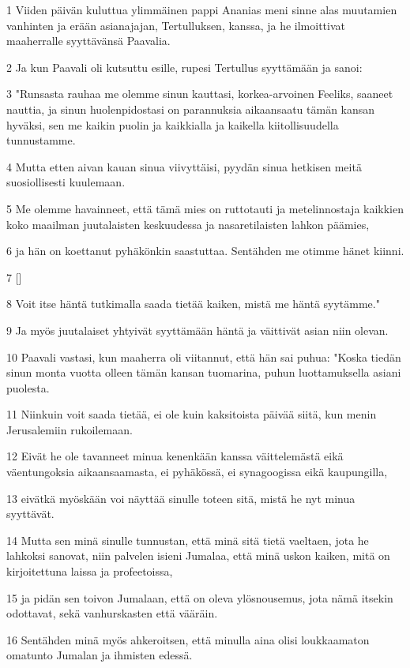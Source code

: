 \par 1 Viiden päivän kuluttua ylimmäinen pappi Ananias meni sinne alas muutamien vanhinten ja erään asianajajan, Tertulluksen, kanssa, ja he ilmoittivat maaherralle syyttävänsä Paavalia.
\par 2 Ja kun Paavali oli kutsuttu esille, rupesi Tertullus syyttämään ja sanoi:
\par 3 "Runsasta rauhaa me olemme sinun kauttasi, korkea-arvoinen Feeliks, saaneet nauttia, ja sinun huolenpidostasi on parannuksia aikaansaatu tämän kansan hyväksi, sen me kaikin puolin ja kaikkialla ja kaikella kiitollisuudella tunnustamme.
\par 4 Mutta etten aivan kauan sinua viivyttäisi, pyydän sinua hetkisen meitä suosiollisesti kuulemaan.
\par 5 Me olemme havainneet, että tämä mies on ruttotauti ja metelinnostaja kaikkien koko maailman juutalaisten keskuudessa ja nasaretilaisten lahkon päämies,
\par 6 ja hän on koettanut pyhäkönkin saastuttaa. Sentähden me otimme hänet kiinni.
\par 7 []
\par 8 Voit itse häntä tutkimalla saada tietää kaiken, mistä me häntä syytämme."
\par 9 Ja myös juutalaiset yhtyivät syyttämään häntä ja väittivät asian niin olevan.
\par 10 Paavali vastasi, kun maaherra oli viitannut, että hän sai puhua: "Koska tiedän sinun monta vuotta olleen tämän kansan tuomarina, puhun luottamuksella asiani puolesta.
\par 11 Niinkuin voit saada tietää, ei ole kuin kaksitoista päivää siitä, kun menin Jerusalemiin rukoilemaan.
\par 12 Eivät he ole tavanneet minua kenenkään kanssa väittelemästä eikä väentungoksia aikaansaamasta, ei pyhäkössä, ei synagoogissa eikä kaupungilla,
\par 13 eivätkä myöskään voi näyttää sinulle toteen sitä, mistä he nyt minua syyttävät.
\par 14 Mutta sen minä sinulle tunnustan, että minä sitä tietä vaeltaen, jota he lahkoksi sanovat, niin palvelen isieni Jumalaa, että minä uskon kaiken, mitä on kirjoitettuna laissa ja profeetoissa,
\par 15 ja pidän sen toivon Jumalaan, että on oleva ylösnousemus, jota nämä itsekin odottavat, sekä vanhurskasten että vääräin.
\par 16 Sentähden minä myös ahkeroitsen, että minulla aina olisi loukkaamaton omatunto Jumalan ja ihmisten edessä.
